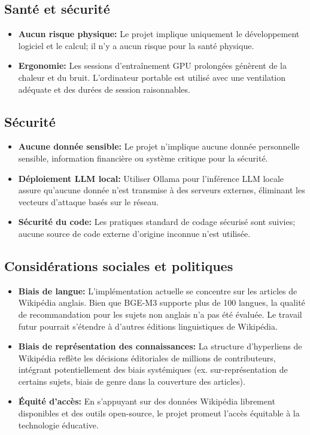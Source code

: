 \subsection{Santé et sécurité}

\begin{itemize}
    \item \textbf{Aucun risque physique:} Le projet implique uniquement le développement logiciel et le calcul; il n'y a aucun risque pour la santé physique.
    \item \textbf{Ergonomie:} Les sessions d'entraînement GPU prolongées génèrent de la chaleur et du bruit. L'ordinateur portable est utilisé avec une ventilation adéquate et des durées de session raisonnables.
\end{itemize}

\subsection{Sécurité}

\begin{itemize}
    \item \textbf{Aucune donnée sensible:} Le projet n'implique aucune donnée personnelle sensible, information financière ou système critique pour la sécurité.
    \item \textbf{Déploiement LLM local:} Utiliser Ollama pour l'inférence LLM locale assure qu'aucune donnée n'est transmise à des serveurs externes, éliminant les vecteurs d'attaque basés sur le réseau.
    \item \textbf{Sécurité du code:} Les pratiques standard de codage sécurisé sont suivies; aucune source de code externe d'origine inconnue n'est utilisée.
\end{itemize}

\subsection{Considérations sociales et politiques}

\begin{itemize}
    \item \textbf{Biais de langue:} L'implémentation actuelle se concentre sur les articles de Wikipédia anglais. Bien que BGE-M3 supporte plus de 100 langues, la qualité de recommandation pour les sujets non anglais n'a pas été évaluée. Le travail futur pourrait s'étendre à d'autres éditions linguistiques de Wikipédia.
    \item \textbf{Biais de représentation des connaissances:} La structure d'hyperliens de Wikipédia reflète les décisions éditoriales de millions de contributeurs, intégrant potentiellement des biais systémiques (ex. sur-représentation de certains sujets, biais de genre dans la couverture des articles).
    \item \textbf{Équité d'accès:} En s'appuyant sur des données Wikipédia librement disponibles et des outils open-source, le projet promeut l'accès équitable à la technologie éducative.
\end{itemize}

